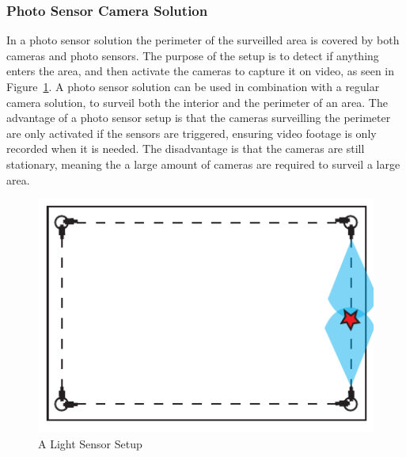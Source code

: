 \subsubsection{Photo Sensor Camera Solution}
In a photo sensor solution the perimeter of the surveilled area is covered by both cameras and photo sensors.
The purpose of the setup is to detect if anything enters the area, and then activate the cameras to capture it on video, as seen in Figure~\ref{fig:photo_sensor}.
A photo sensor solution can be used in combination with a regular camera solution, to surveil both the interior and the perimeter of an area.
The advantage of a photo sensor setup is that the cameras surveilling the perimeter are only activated if the sensors are triggered, ensuring video footage is only recorded when it is needed.
The disadvantage is that the cameras are still stationary, meaning the a large amount of cameras are required to surveil a large area.
\begin{figure}[htb]
    \centering
    \includegraphics[width=\textwidth]{gfx/light_sensor.pdf}
    \caption{A Light Sensor Setup}
    \label{fig:photo_sensor}
\end{figure}

